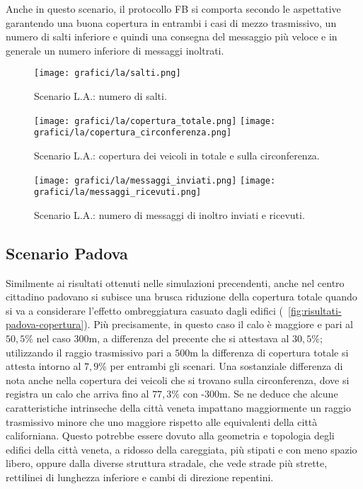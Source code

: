 Anche in questo scenario, il protocollo FB si comporta secondo le aspettative
garantendo una buona copertura in entrambi i casi di mezzo trasmissivo,
un numero di salti inferiore e quindi una consegna del messaggio più veloce
e in generale un numero inferiore di messaggi inoltrati.
%
\begin{figure}[htbp]
	\centering
		\texttt{[image: grafici/la/salti.png]}
\caption{Scenario L.A.: numero di salti.\label{fig:risultati-la-salti}}
\end{figure}
%
\begin{figure}[htbp]
	\centering
		\texttt{[image: grafici/la/copertura\_totale.png]}
		\texttt{[image: grafici/la/copertura\_circonferenza.png]}
\caption{Scenario L.A.: copertura dei veicoli in totale e sulla circonferenza.\label{fig:risultati-la-copertura}}
\end{figure}
%
\begin{figure}[htbp]
	\centering
		\texttt{[image: grafici/la/messaggi\_inviati.png]}
		\texttt{[image: grafici/la/messaggi\_ricevuti.png]}
\caption{Scenario L.A.: numero di messaggi di inoltro inviati e ricevuti.\label{fig:risultati-la-messaggi}}
\end{figure}
\clearpage
%
%
\subsection{Scenario Padova}\label{subsec:risultati-pd}
Similmente ai risultati ottenuti nelle simulazioni precendenti,
anche nel centro cittadino padovano si subisce una brusca riduzione della copertura totale
quando si va a considerare l'effetto ombreggiatura casuato dagli edifici (\figurename~\ref{fig:risultati-padova-copertura}).
Più precisamente, in questo caso il calo è maggiore e pari al $50,5\%$ nel caso $300$m,
a differenza del precente che si attestava al $30,5\%$;
utilizzando il raggio trasmissivo pari a $500$m la differenza di copertura totale si attesta
intorno al $7,9\%$ per entrambi gli scenari.
Una sostanziale differenza di nota anche nella copertura dei veicoli che si trovano sulla circonferenza,
dove si registra un calo che arriva fino al $77,3\%$ con \statica{}-$300$m.
Se ne deduce che alcune caratteristiche intrinseche della città veneta
impattano maggiormente un raggio trasmissivo minore che uno maggiore rispetto
alle equivalenti della città californiana. %
Questo potrebbe essere dovuto alla geometria e topologia degli edifici della città
veneta, a ridosso della careggiata, più stipati e con meno spazio libero,
oppure dalla diverse struttura stradale, che vede strade più strette,
rettilinei di lunghezza inferiore e cambi di direzione repentini.

